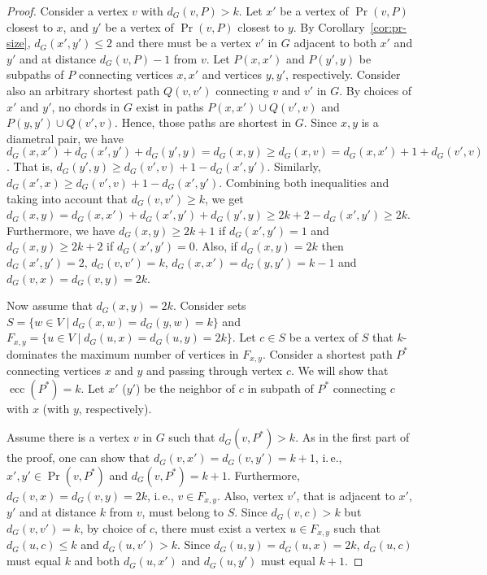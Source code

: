 \documentclass[10pt]{llncs}
\makeatletter
\newcommand{\ie}{i.\,e.\@ifnextchar{,}{}{~}}
\DeclareMathOperator{\ecc}{ecc}
\makeatother
\begin{document}
\begin{proof} 
Consider a vertex $v$ with $d_G(v,P) > k$. 
Let $x'$ be a vertex of $\Pr(v,P)$ closest to $x$, and $y'$ be a vertex of $\Pr(v,P)$ closest to $y$. 
By Corollary~\ref{cor:pr-size}, $d_G(x',y') \leq 2$ and there must be a vertex $v'$ in $G$ adjacent to both $x'$ and $y'$ and at distance $d_G(v,P) - 1$ from $v$. 
Let $P(x,x')$ and $P(y',y)$ be subpaths of $P$ connecting vertices $x,x'$ and vertices $y,y'$, respectively. 
Consider also an arbitrary shortest path $Q(v,v')$ connecting $v$ and $v'$ in $G$. 
By choices of $x'$ and $y'$, no chords in $G$ exist in paths $P(x,x') \cup Q(v',v)$ and $P(y,y') \cup Q(v',v)$. 
Hence, those paths are shortest in $G$. 
Since $x,y$ is a diametral pair, we have $d_G(x,x') + d_G(x',y') + d_G(y',y) = d_G(x,y) \geq d_G(x,v) = d_G(x,x') + 1 + d_G(v',v)$. 
That is, $d_G(y',y) \geq d_G(v',v) + 1 - d_G(x',y')$.
Similarly, $d_G(x',x) \geq d_G(v',v)+1-d_G(x',y')$. 
Combining both inequalities and taking into account that $d_G(v,v') \geq k$, we get  $d_G(x,y) = d_G(x,x') + d_G(x',y') + d_G(y',y) \geq 2k + 2 - d_G(x',y') \geq 2k$. 
Furthermore, we have $d_G(x,y) \geq 2k + 1$ if $d_G(x',y') = 1$ and $d_G(x,y) \geq 2k + 2$ if $d_G(x',y') = 0$.
Also, if $d_G(x,y) = 2k$ then $d_G(x',y') = 2$, $d_G(v,v') = k$, $d_G(x,x') = d_G(y,y') = k-1$ and $d_G(v,x) = d_G(v,y) = 2k$.

Now assume that $d_G(x,y) = 2k$. 
Consider sets $S = \{ w \in V \mid d_G(x,w) = d_G(y,w) = k \}$ and $F_{x,y} = \{u \in V \mid d_G(u,x) = d_G(u,y) = 2k \}$. 
Let $c \in S$ be a vertex of $S$ that $k$-dominates the maximum number of vertices in $F_{x,y}$. 
Consider a shortest path $P^*$ connecting vertices $x$ and $y$ and passing through vertex $c$. 
We will show that $\ecc(P^*) = k$. 
Let $x'$ ($y'$) be the neighbor of $c$ in subpath of $P^*$ connecting $c$ with $x$ (with $y$, respectively).

Assume there is a vertex $v$ in $G$ such that $d_G(v,P^*) > k$. 
As in the first part of the proof, one can show that $d_G(v,x') = d_G(v,y') = k + 1$, \ie, $x',y' \in \Pr(v,P^*)$ and $d_G(v,P^*) = k + 1$. 
Furthermore, $d_G(v,x) = d_G(v,y) = 2k$, \ie, $v \in F_{x,y}$. 
Also, vertex $v'$, that is adjacent to $x'$, $y'$ and at distance $k$ from $v$, must belong to $S$. 
Since $d_G(v,c) > k$ but $d_G(v,v') = k$, by choice of $c$, there must exist a vertex $u \in F_{x,y}$ such that $d_G(u,c) \leq k$ and $d_G(u,v') > k$. 
Since $d_G(u,y) = d_G(u,x) = 2k$, $d_G(u,c)$ must equal $k$ and both $d_G(u,x')$ and $d_G(u,y')$ must equal $k + 1$.  


\end{proof}
\end{document}
